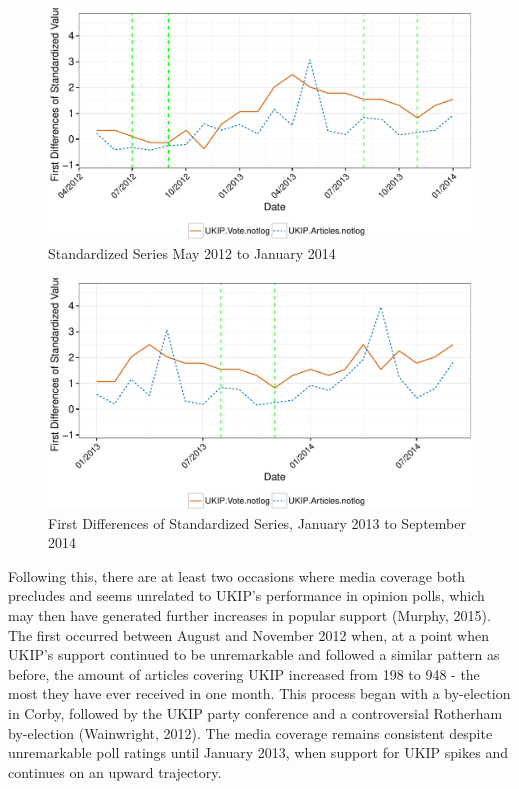 \documentclass[12pt,article]{article}
\begin{document}
\begin{figure}[htbp]
\centering
\includegraphics{ukip_media_files/figure-latex/unnamed-chunk-8-1.pdf}
\caption{Standardized Series May 2012 to January 2014}
\end{figure}

\begin{figure}[htbp]
\centering
\includegraphics{ukip_media_files/figure-latex/unnamed-chunk-9-1.pdf}
\caption{First Differences of Standardized Series, January 2013 to
September 2014}
\end{figure}

Following this, there are at least two occasions where media coverage
both precludes and seems unrelated to UKIP's performance in opinion
polls, which may then have generated further increases in popular
support (Murphy, 2015). The first occurred between August and November
2012 when, at a point when UKIP's support continued to be unremarkable
and followed a similar pattern as before, the amount of articles
covering UKIP increased from 198 to 948 - the most they have ever
received in one month. This process began with a by-election in Corby,
followed by the UKIP party conference and a controversial Rotherham
by-election (Wainwright, 2012). The media coverage remains consistent
despite unremarkable poll ratings until January 2013, when support for
UKIP spikes and continues on an upward trajectory.
\end{document}
